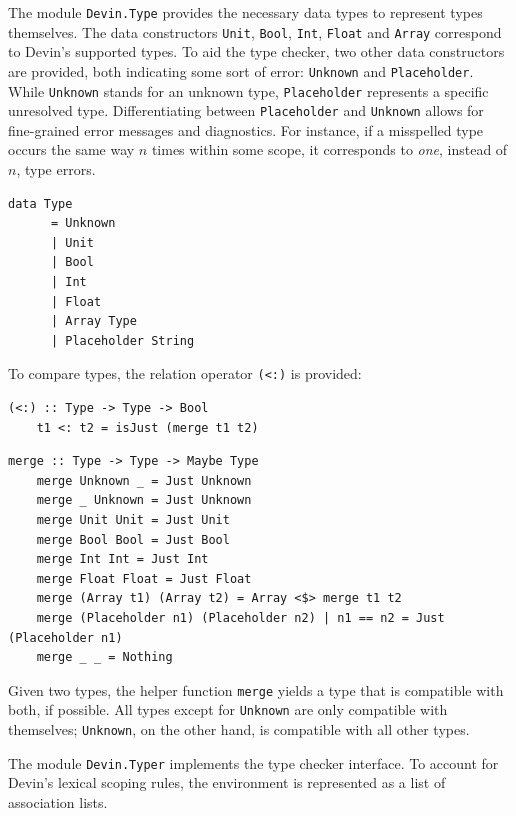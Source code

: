 \documentclass[UdineBachThesis,american,11pt]{PhdThesis}
\begin{document}
  The module \mbox{\texttt{Devin.Type}} provides the necessary data types to
  represent types themselves. The data constructors \mbox{\texttt{Unit}},
  \mbox{\texttt{Bool}}, \mbox{\texttt{Int}}, \mbox{\texttt{Float}} and
  \mbox{\texttt{Array}} correspond to Devin's supported types. To aid the type
  checker, two other data constructors are provided, both indicating some sort
  of error: \mbox{\texttt{Unknown}} and \mbox{\texttt{Placeholder}}. While
  \mbox{\texttt{Unknown}} stands for an unknown type,
  \mbox{\texttt{Placeholder}} represents a specific unresolved type.
  Differentiating between \mbox{\texttt{Placeholder}} and
  \mbox{\texttt{Unknown}} allows for fine-grained error messages and
  diagnostics. For instance, if a misspelled type occurs the same way $n$ times
  within some scope, it corresponds to \emph{one}, instead of $n$, type errors.

  \begin{Verbatim}[gobble=4,fontsize=\small]
    data Type
      = Unknown
      | Unit
      | Bool
      | Int
      | Float
      | Array Type
      | Placeholder String
  \end{Verbatim}

  To compare types, the relation operator \mbox{\texttt{(<:)}} is provided:

  \begin{Verbatim}[gobble=4,fontsize=\small]
    (<:) :: Type -> Type -> Bool
    t1 <: t2 = isJust (merge t1 t2)
  \end{Verbatim}

  \pagebreak

  \begin{Verbatim}[gobble=4,fontsize=\small]
    merge :: Type -> Type -> Maybe Type
    merge Unknown _ = Just Unknown
    merge _ Unknown = Just Unknown
    merge Unit Unit = Just Unit
    merge Bool Bool = Just Bool
    merge Int Int = Just Int
    merge Float Float = Just Float
    merge (Array t1) (Array t2) = Array <$> merge t1 t2
    merge (Placeholder n1) (Placeholder n2) | n1 == n2 = Just (Placeholder n1)
    merge _ _ = Nothing
  \end{Verbatim}

  Given two types, the helper function \mbox{\texttt{merge}} yields a type that
  is compatible with both, if possible. All types except for
  \mbox{\texttt{Unknown}} are only compatible with themselves;
  \mbox{\texttt{Unknown}}, on the other hand, is compatible with all other
  types.

  The module \mbox{\texttt{Devin.Typer}} implements the type checker interface.
  To account for Devin's lexical scoping rules, the environment is represented
  as a list of association lists.
\end{document}
